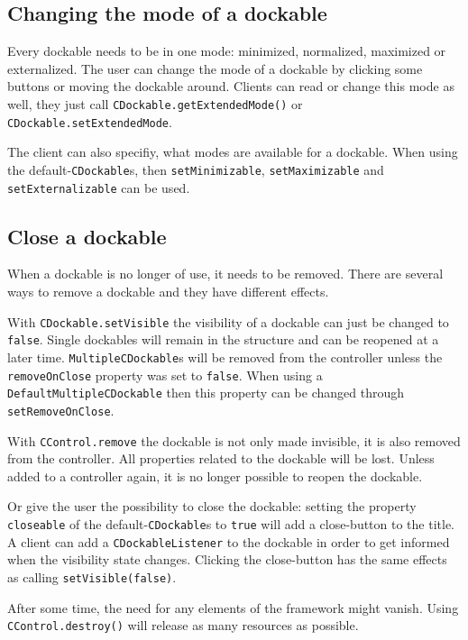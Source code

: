 \documentclass[a4paper,10pt]{article}
\newcommand{\src}[1]{\lstinline[basicstyle=\ttfamily]|#1|}
\begin{document}
\subsection{Changing the mode of a dockable}
Every dockable needs to be in one mode: minimized, normalized, maximized or externalized. The user can change the mode of a dockable by clicking some buttons or moving the dockable around. Clients can read or change this mode as well, they just call \src{CDockable.getExtendedMode()} or \src{CDockable.setExtendedMode}.

The client can also specifiy, what modes are available for a dockable. When using the default-\src{CDockable}s, then \src{setMinimizable}, \src{setMaximizable} and \\\src{setExternalizable} can be used.

\subsection{Close a dockable}
When a dockable is no longer of use, it needs to be removed. There are several ways to remove a dockable and they have different effects.

With \src{CDockable.setVisible} the visibility of a dockable can just be changed to \src{false}. Single dockables will remain in the structure and can be reopened at a later time. \src{MultipleCDockable}s will be removed from the controller unless the \src{removeOnClose} property was set to \src{false}. When using a \\\src{DefaultMultipleCDockable} then this property can be changed through \\\src{setRemoveOnClose}.

With \src{CControl.remove} the dockable is not only made invisible, it is also removed from the controller. All properties related to the dockable will be lost. Unless added to a controller again, it is no longer possible to reopen the dockable.

Or give the user the possibility to close the dockable: setting the property \src{closeable} of the default-\src{CDockable}s to \src{true} will add a close-button to the title. A client can add a \src{CDockableListener} to the dockable in order to get informed when the visibility state changes. Clicking the close-button has the same effects as calling \src{setVisible(false)}.

After some time, the need for any elements of the framework might vanish. Using \src{CControl.destroy()} will release as many resources as possible.
\end{document}
